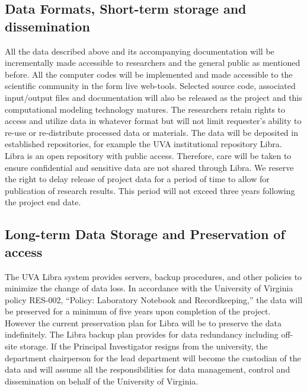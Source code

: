 \subsection*{Data Formats, Short-term storage and dissemination}
All the data described above and its accompanying documentation will be incrementally made accessible to researchers and the general public as mentioned before.  All the computer codes will be implemented and made accessible to the scientific community in the form live web-tools. Selected source code, associated input/output files and documentation will also be released as the project and this computational modeling technology matures. The researchers retain rights to access and utilize data in whatever format but will not limit requester’s ability to re-use or re-distribute processed data or materials. The data will be deposited in established repositories, for example the UVA institutional repository Libra. Libra is an open repository with public access. Therefore, care will be taken to ensure confidential and sensitive data are not shared through Libra. We reserve the right to delay release of project data for a period of time to allow for publication of research results. This period will not exceed three years following the project end date.

\subsection*{Long-term Data Storage and Preservation of access}
The UVA Libra system provides servers, backup procedures, and other policies to minimize the change of data loss. In accordance with the University of Virginia policy RES-002, “Policy: Laboratory Notebook and Recordkeeping,” the data will be preserved for a minimum of five years upon completion of the project. However the current preservation plan for Libra will be to preserve the data indefinitely.  The Libra backup plan provides for data redundancy including off-site storage.  If the Principal Investigator resigns from the university, the department chairperson for the lead department will become the custodian of the data and will assume all the responsibilities for data management, control and dissemination on behalf of the University of Virginia.

